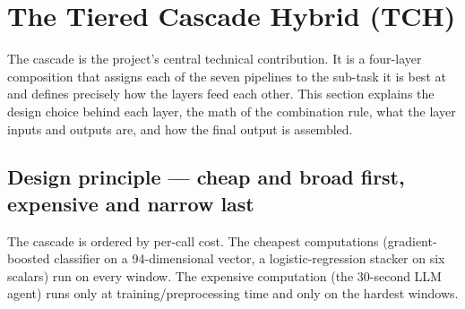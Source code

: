 \section{The Tiered Cascade Hybrid (TCH)}
\label{sec:cascade}

The cascade is the project's central technical contribution. It is a four-layer composition that assigns each of the seven pipelines to the sub-task it is best at and defines precisely how the layers feed each other. This section explains the design choice behind each layer, the math of the combination rule, what the layer inputs and outputs are, and how the final output is assembled.

\subsection{Design principle --- cheap and broad first, expensive and narrow last}

The cascade is ordered by per-call cost. The cheapest computations (gradient-boosted classifier on a 94-dimensional vector, a logistic-regression stacker on six scalars) run on every window. The expensive computation (the 30-second LLM agent) runs only at training/preprocessing time and only on the hardest windows.

